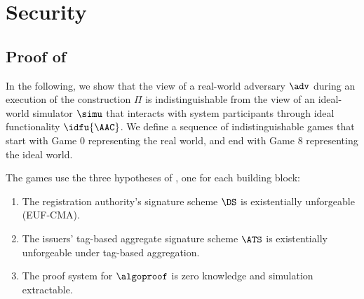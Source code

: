 \section{Security}\label{sec:agg-creds-security}


\subsection{Proof of }\label{sec:agg-creds-proof-1}

In the following, we show that the view of a real-world adversary $\adv$ during
an execution of the construction $\Pi$ is indistinguishable from the view of an ideal-world
simulator $\simu$ that interacts with system participants through ideal
functionality $\idfu{\AAC}$.  We define a sequence of indistinguishable games
that start with Game 0 representing the real world, and end with Game 8
representing the ideal world.

The games use the three hypotheses of
, one for each building block:

\begin{enumerate}

  \item[(P1)] The registration authority's signature scheme $\DS$ is
existentially unforgeable (EUF-CMA).

  \item[(P2)] The issuers' tag-based aggregate signature scheme $\ATS$ is
existentially unforgeable under tag-based aggregation.

  \item[(P3)] The proof system for $\algoproof$ is zero knowledge and
simulation extractable.

\end{enumerate}

